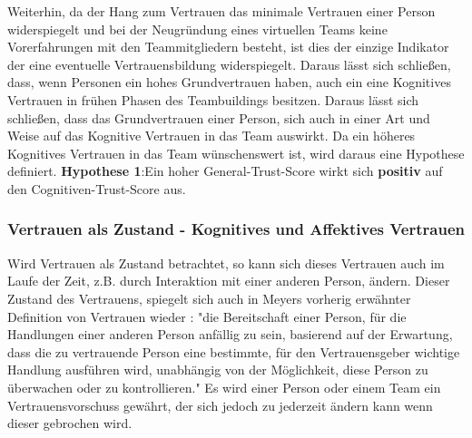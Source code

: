 \documentclass[a4paper,11pt]{article}%
\renewcommand{\\}{\vspace*{0.5\baselineskip} \newline}
\begin{document}
Weiterhin, da der Hang zum Vertrauen das minimale Vertrauen einer Person widerspiegelt und bei der Neugründung eines virtuellen Teams keine Vorerfahrungen mit den Teammitgliedern besteht, ist dies der einzige Indikator der eine eventuelle Vertrauensbildung widerspiegelt.
Daraus lässt sich schließen, dass, wenn Personen ein hohes Grundvertrauen haben, auch ein eine  Kognitives Vertrauen in frühen Phasen des Teambuildings besitzen. \\ 
Daraus lässt sich schließen, dass das Grundvertrauen einer Person, sich auch in einer Art und Weise auf das Kognitive Vertrauen in das Team auswirkt. Da ein höheres Kognitives Vertrauen in das Team wünschenswert ist, wird daraus eine Hypothese definiert.
\\
\textbf{Hypothese 1}:Ein hoher General-Trust-Score wirkt sich \textbf{positiv} auf den Cognitiven-Trust-Score aus.
\\
	\subsubsection{Vertrauen als Zustand - Kognitives und Affektives Vertrauen \newline}

Wird Vertrauen als \dq Zustand\dq{} betrachtet, so kann sich dieses Vertrauen auch im Laufe der Zeit, z.B. durch Interaktion mit einer anderen Person, ändern. Dieser \dq Zustand\dq{} des Vertrauens, spiegelt sich auch in Meyers \citep[p.712]{mayer1995integrative} vorherig erwähnter Definition von Vertrauen wieder :\\ "die Bereitschaft einer Person, für die Handlungen einer anderen Person anfällig zu sein, basierend auf der Erwartung, dass die zu vertrauende Person eine bestimmte, für den Vertrauensgeber wichtige Handlung ausführen wird, unabhängig von der Möglichkeit, diese Person zu überwachen oder zu kontrollieren."
Es wird einer Person oder einem Team ein Vertrauensvorschuss gewährt, der sich jedoch zu jederzeit ändern kann wenn dieser gebrochen wird.

\end{document}
